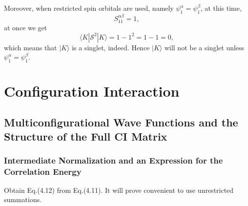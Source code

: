 \documentclass[a4paper]{book}
\newcounter{exercise}[chapter]
\newcounter{solution}[chapter]
\begin{document}
\begin{solution}
\begin{itemize}
	Moreover, when restricted spin orbitals are used, namely $\psi^\alpha_1 = \psi^\beta_1$, at this time,
	\[
		S^{\alpha\beta}_{11} = 1,
	\]	
	at once we get
	\[
		\langle K | \mathscr{S}^2 | K \rangle = 1 - 1^2 = 1 - 1 = 0 ,
	\]
	which means that $| K \rangle $ is a singlet, indeed. Hence $| K \rangle$ will not be a singlet unless $\psi^\alpha_1 = \psi^\beta_1$.
	
	\end{itemize}
	
	\end{solution}
	
	\clearpage 
	
	
	\setcounter{chapter}{3}

	\chapter{Configuration Interaction}
	
	\section{Multiconfigurational Wave Functions and the Structure of the Full CI Matrix}
	
	\subsection{Intermediate Normalization and an Expression for the Correlation Energy}
	
	\begin{exercise}
	Obtain Eq.(4.12) from Eq.(4.11). It will prove convenient to use unrestricted summations.
	\end{exercise}
	
\end{document}
